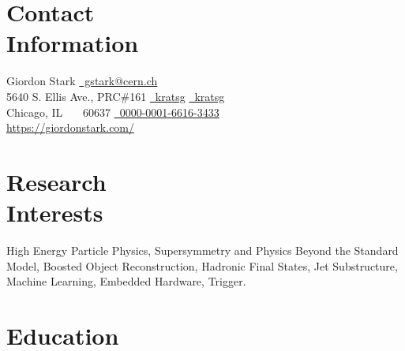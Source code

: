\documentclass[margin,line]{resume}
\let\origsection\section%
\let\section\subsection%
\let\section\origsection%
\begin{document}
\begin{resume}

\section{\mysidestyle Contact\\Information}

Giordon Stark                 \hfill \href{mailto:gstark@cern.ch}{~gstark@cern.ch}
\vspace{0mm}\\\vspace{0mm}%
5640 S. Ellis Ave., PRC\#161  \hfill \href{https://github.com/kratsg}{~kratsg} {\large\rmfamily\textbullet} \href{https://twitter.com/kratsg}{~kratsg}
\vspace{0mm}\\\vspace{0mm}%
Chicago, IL \ \ \ 60637       \hfill \href{https://orcid.org/0000-0001-6616-3433}{~0000-0001-6616-3433}
\vspace{0mm}\\\vspace{0mm}%
\null\hfill\href{https://giordonstark.com/?utm_source=cv}{https://giordonstark.com/}\\
\vspace{-6.5mm}%

\section{\mysidestyle Research\\Interests}
{\small
High Energy Particle Physics, Supersymmetry and Physics Beyond the Standard
Model, Boosted Object Reconstruction, Hadronic Final States, Jet
Substructure, Machine Learning, Embedded Hardware, Trigger.
}
\section{\mysidestyle Education}


\end{resume}
\end{document}
